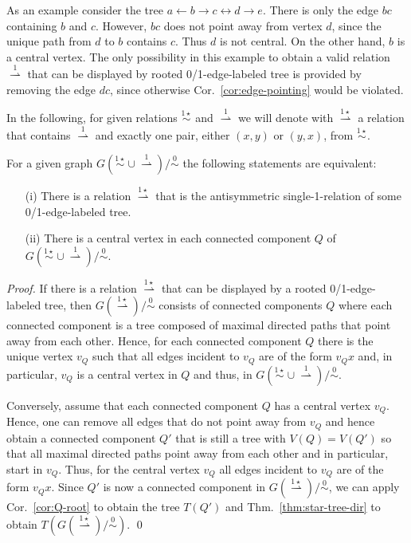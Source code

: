 \documentclass[smallextended]{svjour3}
\newcommand{\rev}[1]{\begingroup\color{blue}#1\endgroup}
\newcommand{\Ro}{\mathrel{\overset{0}{\sim}}}
\newcommand{\Rlstar}{\mathrel{\overset{1\star}{\sim}}}
\newcommand{\Rldstar}{\mathrel{\overset{1\star}{\rightharpoonup}}}
\newcommand{\Rld}{\mathrel{\overset{1}{\rightharpoonup}}}
\begin{document}
As an example consider the tree $a\leftarrow b\rightarrow c \leftrightarrow
d\rightarrow e$. \rev{ There is only the edge $bc$ containing $b$ and $c$.
However, $bc$ does not point away from vertex $d$, since the unique path
from $d$ to $b$ contains $c$.}  
Thus $d$ is not central. On the other hand, $b$ is a
central vertex. The only possibility in this example to obtain a valid
relation $\Rld$ that can be displayed by rooted 0/1-edge-labeled tree is
provided by removing the edge $dc$, since otherwise Cor.\
\ref{cor:edge-pointing} would be violated.

In the following, for given relations $\Rlstar$ and $\Rld$ we will denote
with $\Rldstar$ a relation that contains $\Rld$ and exactly one pair,
either $(x,y)$ or $(y,x)$, from $\Rlstar$.

\begin{lemma}
  For a given graph $G(\Rlstar\cup\Rld)/\Ro$ the following statements
  are equivalent:
  \begin{itemize}
  \item[(i)] There is a relation $\Rldstar$ that is the antisymmetric
    single-1-relation of some 0/1-edge-labeled tree.
  \item[(ii)] There is a central vertex in each connected component $Q$ of
    $G(\Rlstar\cup\Rld)/\Ro$.
  \end{itemize}
\end{lemma}
\begin{proof}
  If there is a relation $\Rldstar$ that can be displayed by a rooted
  0/1-edge-labeled tree, then $G(\Rldstar)/\Ro$ consists of connected
  components $Q$ where each connected component is a tree composed of
  maximal directed paths that point away from each other. 
  Hence, for each connected component
  $Q$ there is the unique vertex $v_Q$ such that all edges incident to
  $v_Q$ are of the form $v_Qx$ and, in particular, $v_Q$ is a central
  vertex in $Q$ and thus, in $G(\Rlstar\cup\Rld)/\Ro$.

  Conversely, assume that each connected component $Q$ has a central
  vertex $v_Q$. Hence, one can remove all edges that do not point away from
  $v_Q$ and hence obtain a connected component $Q'$ that is still a tree
  with $V(Q)=V(Q')$ so that all maximal directed paths point away from each
  other and in particular, start in $v_Q$.  Thus, for the central vertex
  $v_Q$ all edges incident to $v_Q$ are of the form $v_Qx$. Since $Q'$ is
  now a connected component in $G(\Rldstar)/\Ro$, we can apply Cor.\
  \ref{cor:Q-root} to obtain the tree $T(Q')$ and
  Thm.\ \ref{thm:star-tree-dir} to obtain $T(G(\Rldstar)/\Ro)$. \qed
\end{proof}
\end{document}
